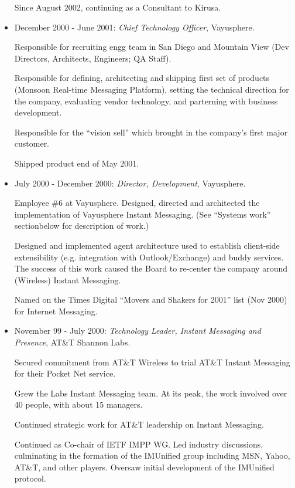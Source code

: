 \documentclass{article}
\begin{document}
\begin{itemize}
  Since August 2002, continuing as a Consultant to Kirusa.

\item December 2000 - June 2001: \textit{Chief Technology Officer}, Vayusphere.

  Responsible for recruiting engg team in San Diego and Mountain View
  (Dev Directors, Architects, Engineers; QA Staff).

  Responsible for defining, architecting and shipping first set of
  products (Monsoon Real-time Messaging Platform), setting the
  technical direction for the company, evaluating vendor technology,
  and parterning with business development.

  Responsible for the ``vision sell'' which brought in the company's
  first major customer.

  Shipped product end of May 2001.
  
\item July 2000 - December 2000:  \textit{Director, Development}, Vayusphere.

  Employee \#6 at Vayusphere. Designed, directed and architected the
  implementation of Vayusphere Instant Messaging. (See ``Systems
  work'' sectionbelow for description of work.)

  Designed and implemented agent architecture used to establish
  client-side extensibility (e.g. integration with Outlook/Exchange)
  and buddy services. The success of this work caused the Board to
  re-center the company around (Wireless) Instant Messaging.
  
  Named on the Times Digital ``Movers and Shakers for 2001'' list (Nov
  2000) for Internet Messaging.
  
\item November 99 - July 2000: 
  \textit{Technology Leader, Instant Messaging and Presence}, AT\&T Shannon
  Labs.

  Secured commitment from AT\&T Wireless to trial AT\&T Instant
  Messaging for their Pocket Net service. 

  Grew the Labs Instant Messaging team. At its peak, the work
  involved over 40 people, with about 15 managers.

  Continued strategic work for AT\&T leadership on Instant
  Messaging. 

  Continued as Co-chair of IETF IMPP WG. Led industry discussions,
  culminating in the formation of the IMUnified group including MSN,
  Yahoo, AT\&T, and other players. Oversaw initial development of the
  IMUnified protocol.


\end{itemize}
\end{document}
